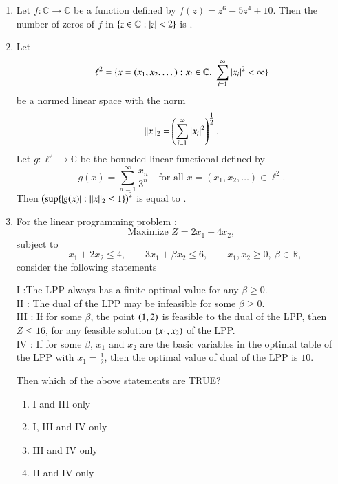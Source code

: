 \documentclass[journal,12pt,onecolumn]{IEEEtran}
\theoremstyle{remark}
\begin{document}
\begin{enumerate}[start=1, label=Q.\arabic*]
\hfill{}


\item Let $f : \mathbb{C} \to \mathbb{C}$ be a function defined by $f(z)=z^6-5z^4+10$.  
Then the number of zeros of $f$ in $\{z \in \mathbb{C} : \left\vert z\right\vert < 2\}$ is \underline{\hspace{2cm}}.  

\hfill{}
\item Let 
\[
\ell^2=\{x=(x_1,x_2,\dots) : x_i \in \mathbb{C},\; \sum_{i=1}^{\infty} \left\vert x_i\right\vert^2 < \infty\}
\]
be a normed linear space with the norm
\[
\|x\|_2=\left(\sum_{i=1}^{\infty} \left\vert x_i\right\vert^2\right)^{\tfrac{1}{2}}.
\]
Let $g : \ell^2 \to \mathbb{C}$ be the bounded linear functional defined by
\[
g(x)=\sum_{n=1}^{\infty} \frac{x_n}{3^n} \quad \text{for all } x=(x_1,x_2,\dots)\in \ell^2.
\]
Then $\left(\sup \{ \left\vert g(x)\right\vert : \|x\|_2 \le 1 \}\right)^2$ is equal to \underline{\hspace{2cm}} \; .  

\hfill{}
\item For the linear programming problem :
\[
\text{Maximize } Z = 2x_1 + 4x_2,
\]
subject to
\[
- x_1 + 2x_2 \le 4,\qquad 3x_1 + \beta x_2 \le 6,\qquad x_1,x_2 \ge 0,\ \beta \in \mathbb{R},
\]
consider the following statements\brak{:}

I :The LPP always has a finite optimal value for any $\beta \ge 0$.\\
II : The dual of the LPP may be infeasible for some $\beta \ge 0$.\\
III : If for some $\beta$, the point $\left(1,2\right)$ is feasible to the dual of the LPP, then $Z \le 16$, for any feasible solution $\left(x_1,x_2\right)$ of the LPP.\\
IV : If for some $\beta$, $x_1$ and $x_2$ are the basic variables in the optimal table of the LPP with $x_1 = \tfrac{1}{2}$, then the optimal value of dual of the LPP is $10$.

Then which of the above statements are TRUE?
\begin{enumerate}
\item I and III only
\item I, III and IV only
\item III and IV only
\item II and IV only
\end{enumerate}


\end{enumerate}
\end{document}
